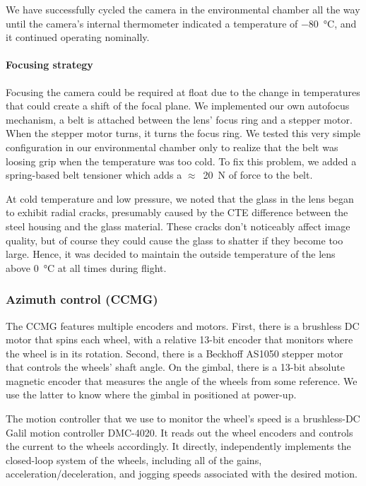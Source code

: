 We have successfully cycled the camera in the environmental chamber all the way until the camera's internal thermometer indicated a temperature of \SI{-80}{\celsius}, and it continued operating nominally.

\paragraph{Focusing strategy}
Focusing the camera could be required at float due to the change in temperatures that could create a shift of the focal plane. We implemented our own autofocus mechanism, a belt is attached between the lens' focus ring and a stepper motor. When the stepper motor turns, it turns the focus ring. We tested this very simple configuration in our environmental chamber only to realize that the belt was loosing grip when the temperature was too cold. To fix this problem, we added a spring-based belt tensioner which adds a $\approx$~\SI{20}{\newton} of force to the belt.

At cold temperature and low pressure, we noted that the glass in the lens began to exhibit radial cracks, presumably caused by the CTE difference between the steel housing and the glass material. These cracks don't noticeably affect image quality, but of course they could cause the glass to shatter if they become too large. Hence, it was decided to maintain the outside temperature of the lens above \SI{0}{\celsius} at all times during flight.



\subsubsection{Azimuth control (CCMG)}

The CCMG features multiple encoders and motors. First, there is a brushless DC motor that spins each wheel, with a relative 13-bit encoder that monitors where the wheel is in its rotation. Second, there is a Beckhoff AS1050 stepper motor that controls the wheels' shaft angle. On the gimbal, there is a 13-bit  absolute magnetic encoder that measures the angle of the wheels from some reference. We use the latter to know where the gimbal in positioned at power-up.

The motion controller that we use to monitor the wheel's speed is a brushless-DC Galil motion controller DMC-4020. It reads out the wheel encoders and controls the current to the wheels accordingly. It directly, independently implements the closed-loop system of the wheels, including all of the gains, acceleration/deceleration, and jogging speeds associated with the desired motion.

